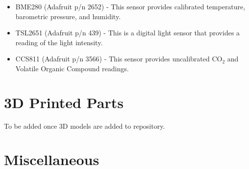 \documentclass[10pt, openany, draft]{article}
\begin{document}
\begin{itemize}
  \item BME280 (Adafruit p/n 2652) - This sensor provides calibrated temperature, barometric pressure, and humidity.
  \item TSL2651 (Adafruit p/n 439) - This is a digital light sensor that provides a reading of the light intensity.
  \item CCS811 (Adafruit p/n 3566) - This sensor provides uncalibrated CO$_2$ and Volatile Organic Compound readings.
\end{itemize}

\section{3D Printed Parts}
To be added once 3D models are added to repository.

\section{Miscellaneous}
\end{document}
